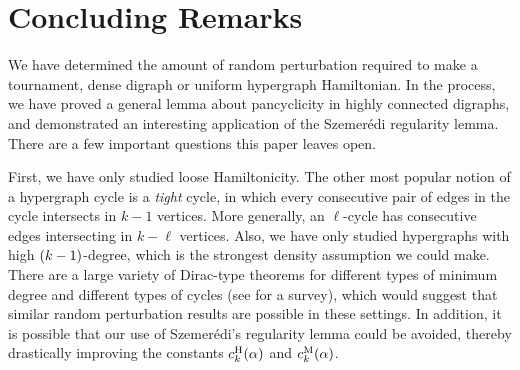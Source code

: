 \documentclass[11pt,english]{article}
\theoremstyle{plain}
\theoremstyle{definition}
\theoremstyle{definition}
\theoremstyle{plain}
\theoremstyle{plain}
\theoremstyle{plain}
\theoremstyle{plain}
\theoremstyle{remark}
\theoremstyle{remark}
\let\originalleft\left
\let\originalright\right
\renewcommand{\left}{\mathopen{}\mathclose\bgroup\originalleft}
\renewcommand{\right}{\aftergroup\egroup\originalright}
\begin{document}
\section{Concluding Remarks}

We have determined the amount of random perturbation required to make
a tournament, dense digraph or uniform hypergraph Hamiltonian. In
the process, we have proved a general lemma about pancyclicity in
highly connected digraphs, and demonstrated an interesting application
of the Szemer\'edi regularity lemma. There are a few important questions
this paper leaves open.

First, we have only studied loose Hamiltonicity. The other most popular
notion of a hypergraph cycle is a \emph{tight} cycle, in which every
consecutive pair of edges in the cycle intersects in $k-1$ vertices.
More generally, an $\ell$-cycle has consecutive edges intersecting
in $k-\ell$ vertices. Also, we have only studied hypergraphs with
high $\left(k-1\right)$-degree, which is the strongest density assumption
we could make. There are a large variety of Dirac-type theorems for
different types of minimum degree and different types of cycles (see
\cite{RR10} for a survey), which would suggest that similar random
perturbation results are possible in these settings. In addition,
it is possible that our use of Szemer\'edi's regularity lemma could
be avoided, thereby drastically improving the constants $\chypham\left(\alpha\right)$
and $\chypmat\left(\alpha\right)$.
\end{document}
